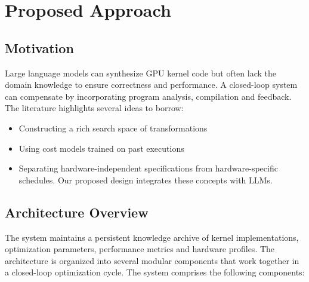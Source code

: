\documentclass{article}
\begin{document}
\section{Proposed Approach}
\subsection{Motivation}

Large language models can synthesize GPU kernel code but often lack the domain knowledge to ensure correctness and performance. A closed-loop system can compensate by incorporating program analysis, compilation and feedback. The literature highlights several ideas to borrow: 
\begin{itemize}
    \item {Constructing a rich search space of transformations}
    \item{Using cost models trained on past executions}
    \item{Separating hardware-independent specifications from hardware-specific schedules. Our proposed design integrates these concepts with LLMs. }
\end{itemize}

\subsection{Architecture Overview}

The system maintains a persistent knowledge archive of kernel implementations, optimization parameters, performance metrics and hardware profiles. The architecture is organized into several modular components that work together in a closed-loop optimization cycle. The system comprises the following components:
\end{document}
